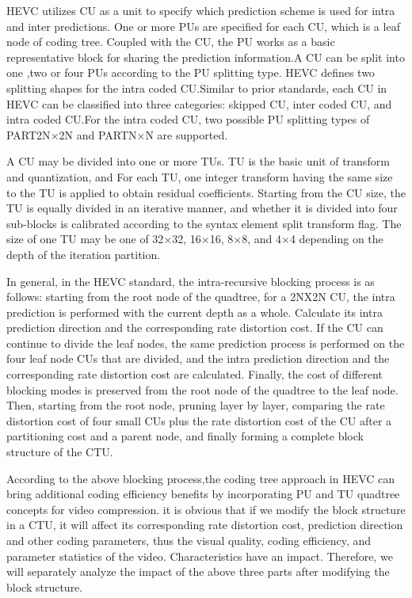 \documentclass[journal,sort]{IEEEtran}
\begin{document}
HEVC utilizes CU as a unit to specify which prediction
scheme is used for intra and inter predictions. One or more PUs are specified for each CU, which is
a leaf node of coding tree. Coupled with the CU, the PU
works as a basic representative block for sharing the prediction
information.A CU can be split into one ,two or four PUs according to
the PU splitting type. HEVC defines two splitting shapes for
the intra coded CU.Similar to prior standards, each CU
in HEVC can be classified into three categories: skipped CU,
inter coded CU, and intra coded CU.For the intra coded CU, two possible
PU splitting types of PART2N$\times$2N and PARTN$\times$N
are supported.

A CU may be divided into one or more TUs. TU is the basic unit of transform and quantization, and For each
TU, one integer transform having the same size to the TU is applied to obtain residual coefficients. Starting from the CU size, the TU is equally divided in an iterative manner, and whether it is divided into four sub-blocks is calibrated according to the syntax element split transform flag. The size of one TU may be one of 32$\times$32, 16$\times$16, 8$\times$8, and 4$\times$4 depending on the depth of the iteration partition.


In general, in the HEVC standard, the intra-recursive blocking process is as follows: starting from the root node of the quadtree, for a 2NX2N CU, the intra prediction is performed with the current depth as a whole. Calculate its intra prediction direction and the corresponding rate distortion cost. If the CU can continue to divide the leaf nodes, the same prediction process is performed on the four leaf node CUs that are divided, and the intra prediction direction and the corresponding rate distortion cost are calculated. Finally, the cost of different blocking modes is preserved from the root node of the quadtree to the leaf node. Then, starting from the root node, pruning layer by layer, comparing the rate distortion cost of four small CUs plus the rate distortion cost of the CU after a partitioning cost and a parent node, and finally forming a complete block structure of the CTU.


According to the above blocking process,the coding tree approach in HEVC can bring additional coding efficiency benefits by incorporating PU and TU quadtree concepts for video compression. it is obvious that if we modify the block structure in a CTU, it will affect its corresponding rate distortion cost, prediction direction and other coding parameters, thus the visual quality, coding efficiency, and parameter statistics of the video. Characteristics have an impact. Therefore, we will separately analyze the impact of the above three parts after modifying the block structure.
\end{document}
